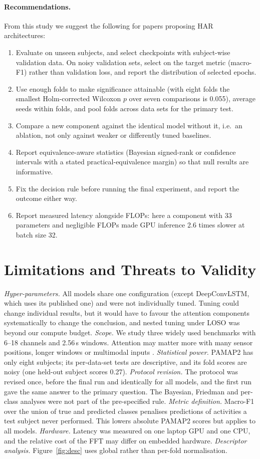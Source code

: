 \documentclass[11pt,a4paper]{article}
\begin{document}
\paragraph{Recommendations.}
From this study we suggest the following for papers proposing HAR architectures:
\begin{enumerate}
  \item Evaluate on unseen subjects, and select checkpoints with subject-wise validation data. On noisy validation sets, select on the target metric (macro-F1) rather than validation loss, and report the distribution of selected epochs.
  \item Use enough folds to make significance attainable (with eight folds the smallest Holm-corrected Wilcoxon $p$ over seven comparisons is 0.055), average seeds within folds, and pool folds across data sets for the primary test.
  \item Compare a new component against the identical model without it, i.e.\ an ablation, not only against weaker or differently tuned baselines.
  \item Report equivalence-aware statistics (Bayesian signed-rank or confidence intervals with a stated practical-equivalence margin) so that null results are informative.
  \item Fix the decision rule before running the final experiment, and report the outcome either way.
  \item Report measured latency alongside FLOPs: here a component with 33 parameters and negligible FLOPs made GPU inference 2.6 times slower at batch size 32.
\end{enumerate}

\section{Limitations and Threats to Validity}
\label{sec:limits}
\emph{Hyper-parameters.} All models share one configuration (except DeepConvLSTM, which uses its published one) and were not individually tuned. Tuning could change individual results, but it would have to favour the attention components systematically to change the conclusion, and nested tuning under LOSO was beyond our compute budget.
\emph{Scope.} We study three widely used benchmarks with 6--18 channels and 2.56\,s windows. Attention may matter more with many sensor positions, longer windows or multimodal inputs \cite{ma2019attnsense}.
\emph{Statistical power.} PAMAP2 has only eight subjects; its per-data-set tests are descriptive, and its fold scores are noisy (one held-out subject scores 0.27).
\emph{Protocol revision.} The protocol was revised once, before the final run and identically for all models, and the first run gave the same answer to the primary question. The Bayesian, Friedman and per-class analyses were not part of the pre-specified rule.
\emph{Metric definition.} Macro-F1 over the union of true and predicted classes penalises predictions of activities a test subject never performed. This lowers absolute PAMAP2 scores but applies to all models.
\emph{Hardware.} Latency was measured on one laptop GPU and one CPU, and the relative cost of the FFT may differ on embedded hardware.
\emph{Descriptor analysis.} Figure~\ref{fig:desc} uses global rather than per-fold normalisation.
\end{document}
